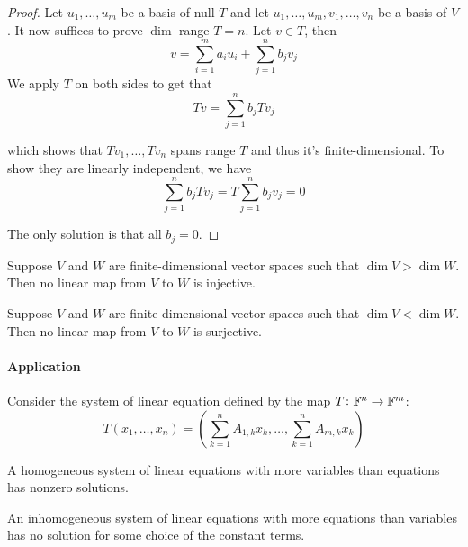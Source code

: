 \documentclass{extarticle}
\begin{document}
\begin{proof}
Let \(u_1, \ldots, u_m\) be a basis of null \(T\) and let \(u_1, \ldots, u_m, v_1, \ldots, v_n\)
be a basis of \(V\). It now suffices to prove \(\dim\) range \(T = n\). Let \(v \in T\), then 
\[v = \sum_{i=1}^{m}a_i u_i + \sum_{j=1}^{n}b_j v_j\]
We apply \(T\) on both sides to get that 
\[Tv = \sum_{j=1}^{n}b_j T v_j \]

which shows that \(Tv_1, \ldots, T v_n\) spans range \(T\) and thus it's finite-dimensional. To show 
they are linearly independent, we have 
\[\sum_{j=1}^{n} b_j T v_j =  T \sum_{j=1}^{n} b_j v_j = 0\]

The only solution is that all \(b_j = 0\). 

\end{proof}

\begin{corollary}
    Suppose \(V\) and \(W\) are finite-dimensional vector spaces such that 
    \(\dim V > \dim W\). Then no linear map from \(V\) to \(W\) is injective. 
\end{corollary}

\begin{corollary}
    Suppose \(V\) and \(W\) are finite-dimensional vector spaces such that 
    \(\dim V < \dim W\). Then no linear map from \(V\) to \(W\) is surjective. 
\end{corollary}

\noindent
\paragraph{Application} Consider the system of linear equation defined by the map \(T \colon \mathbb{F}^n \to \mathbb{F}^m\):
\[T(x_1, \ldots, x_n) = (\sum_{k=1}^{n}A_{1, k}x_k, \ldots, \sum_{k=1}^{n}A_{m, k}x_k)\]

\begin{corollary}
    A homogeneous system of linear equations with more variables than equations has nonzero solutions.
\end{corollary}

\begin{corollary}
    An inhomogeneous system of linear equations with more equations than variables has no 
    solution for some choice of the constant terms. 
\end{corollary}
\end{document}

